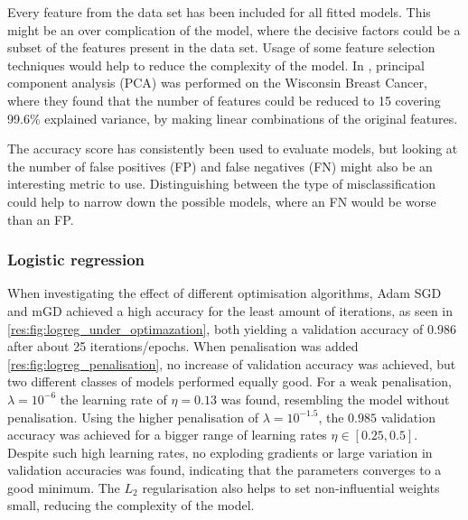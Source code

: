     Every feature from the data set has been included for all fitted models. This might be an over complication of the model, where the decisive factors could be a subset of the features present in the data set. Usage of some feature selection techniques would help to reduce the complexity of the model. In \citep{inproceedings}, principal component analysis (PCA) was performed on the Wisconsin Breast Cancer, where they found that the number of features could be reduced to 15 covering 99.6\% explained variance, by making linear combinations of the original features.

    The accuracy score has consistently been used to evaluate models, but looking at the number of false positives (FP) and false negatives (FN) might also be an interesting metric to use. Distinguishing between the type of misclassification could help to narrow down the possible models, where an FN would be worse than an FP.


    \subsubsection{Logistic regression}
        When investigating the effect of different optimisation algorithms, Adam SGD and mGD achieved a high accuracy for the least amount of iterations, as seen in \cref{res:fig:logreg_under_optimazation}, both yielding a validation accuracy of $0.986$ after about 25 iterations/epochs. When penalisation was added \cref{res:fig:logreg_penalisation}, no increase of validation accuracy was achieved, but two different classes of models performed equally good. For a weak penalisation, $\lambda = 10^{-6}$ the learning rate of $\eta = 0.13$ was found, resembling the model without penalisation. Using the higher penalisation of $\lambda = 10^{-1.5}$, the $0.985$ validation accuracy was achieved for a bigger range of learning rates $\eta \in [0.25, 0.5]$. Despite such high learning rates, no exploding gradients or large variation in validation accuracies was found, indicating that the parameters converges to a good minimum. The $L_2$ regularisation also helps to set non-influential weights small, reducing the complexity of the model.


